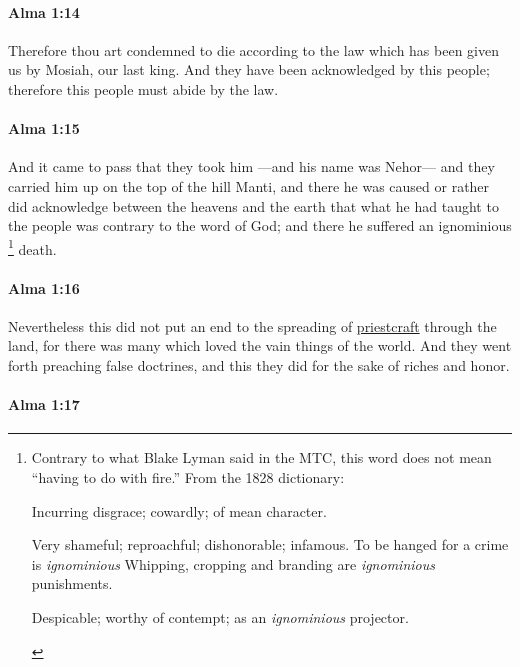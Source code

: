 		\paragraph{Alma 1:14} %
			\label{ALMA-1-14}

			Therefore thou art condemned to die
			according to the law which has been given us by Mosiah, our last king.
			And they have been acknowledged by this people;
			therefore this people must abide by the law.

		\paragraph{Alma 1:15} %
			\label{ALMA-1-15}

			And it came to pass that they took him
			---and his name was Nehor---
			and they carried him up on the top of the hill Manti,
			and there he was caused
			or rather did acknowledge between the heavens and the earth
			that what he had taught to the people was contrary to the word of God;
			and there he suffered an ignominious%
				\footnote{%
					Contrary to what Blake Lyman said in the MTC, this word does not mean ``having to do with fire.'' From the 1828 dictionary:
					\begin{compactitem}
						\item[1] Incurring disgrace; cowardly; of mean character.
						\item[2] Very shameful; reproachful; dishonorable; infamous. To be hanged for a crime is \textit{ignominious} Whipping, cropping and branding are \textit{ignominious} punishments.
						\item[3] Despicable; worthy of contempt; as an \textit{ignominious} projector.
					\end{compactitem}
					}
			death.

		\paragraph{Alma 1:16} %
			\label{ALMA-1-16}

			Nevertheless this did not put an end to the spreading of \hyperref[PRIESTCRAFT]{priestcraft} through the land,
			for there was many which loved the vain things of the world.
			And they went forth preaching false doctrines,
			and this they did for the sake of riches and honor.

		\paragraph{Alma 1:17} %
			\label{ALMA-1-17}


